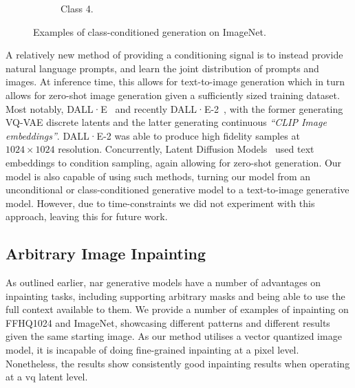 \begin{figure}[ht]
\begin{subfigure}[b]{0.47\textwidth}
        \caption{
            Class 4.
        }
    \end{subfigure}
    \caption{Examples of class-conditioned generation on ImageNet.}
    \label{fig:imagenet}
\end{figure}

A relatively new method of providing a conditioning signal is to instead provide
natural language prompts, and learn the joint distribution of prompts and
images. At inference time, this allows for text-to-image generation which in
turn allows for zero-shot image generation given a sufficiently sized training
dataset. Most notably, DALL·E~\cite{ramesh2021dalle} and recently
DALL·E-2~\cite{ramesh2022dalle2}, with the former generating VQ-VAE discrete
latents and the latter generating continuous \textit{``CLIP Image embeddings''}.
DALL·E-2 was able to produce high fidelity samples at $1024 \times 1024$
resolution. Concurrently, Latent Diffusion
Models~\cite{rombach2021highresolution} used text embeddings to condition
sampling, again allowing for zero-shot generation. Our model is also capable of
using such methods, turning our model from an unconditional or class-conditioned
generative model to a text-to-image generative model. However, due to
time-constraints we did not experiment with this approach, leaving this for
future work.

\subsection{Arbitrary Image Inpainting}

As outlined earlier, \acrlong{nar} generative models have a number of advantages
on inpainting tasks, including supporting arbitrary masks and being able to use
the full context available to them. We provide a number of examples of
inpainting on FFHQ1024 and ImageNet, showcasing different patterns and different
results given the same starting image. As our method utilises a vector quantized
image model, it is incapable of doing fine-grained inpainting at a pixel level.
Nonetheless, the results show consistently good inpainting results when
operating at a \gls{vq} latent level.

